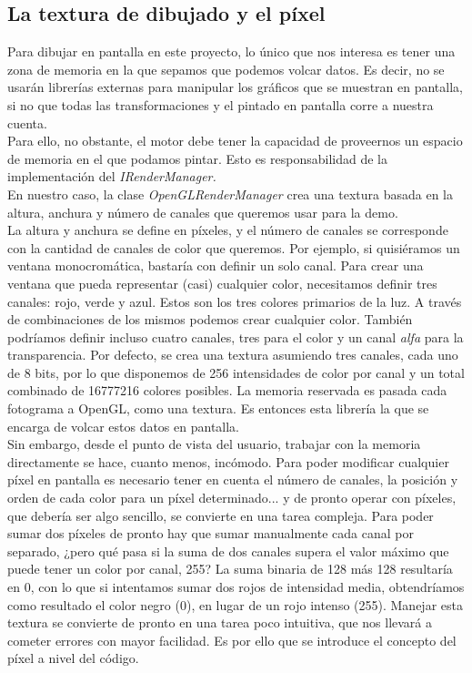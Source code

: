 \subsection{La textura de dibujado y el píxel}

Para dibujar en pantalla en este proyecto, lo único que nos interesa es tener una zona de memoria en la que sepamos que podemos volcar datos. Es decir, no se usarán librerías externas para manipular los gráficos que se muestran en pantalla, si no que todas las transformaciones y el pintado en pantalla corre a nuestra cuenta.\\

Para ello, no obstante, el motor debe tener la capacidad de proveernos un espacio de memoria en el que podamos pintar. Esto es responsabilidad de la implementación del \emph{IRenderManager.}\\

En nuestro caso, la clase \emph{OpenGLRenderManager} crea una textura basada en la altura, anchura y número de canales que queremos usar para la demo.\\

La altura y anchura se define en píxeles, y el número de canales se corresponde con la cantidad de canales de color que queremos. Por ejemplo, si quisiéramos un ventana monocromática, bastaría con definir un solo canal. Para crear una ventana que pueda representar (casi) cualquier color, necesitamos definir tres canales: rojo, verde y azul. Estos son los tres colores primarios de la luz. A través de combinaciones de los mismos podemos crear cualquier color. También podríamos definir incluso cuatro canales, tres para el color y un canal \emph{alfa} para la transparencia. Por defecto, se crea una textura asumiendo tres canales, cada uno de 8 bits, por lo que disponemos de 256 intensidades de color por canal y un total combinado de 16777216 colores posibles. La memoria reservada es pasada cada fotograma a OpenGL, como una textura. Es entonces esta librería la que se encarga de volcar estos datos en pantalla.\\

Sin embargo, desde el punto de vista del usuario, trabajar con la memoria directamente se hace, cuanto menos, incómodo. Para poder modificar cualquier píxel en pantalla es necesario tener en cuenta el número de canales, la posición y orden de cada color para un píxel determinado... y de pronto operar con píxeles, que debería ser algo sencillo, se convierte en una tarea compleja. Para poder sumar dos píxeles de pronto hay que sumar manualmente cada canal por separado, ¿pero qué pasa si la suma de dos canales supera el valor máximo que puede tener un color por canal, 255? La suma binaria de 128 más 128 resultaría en 0, con lo que si intentamos sumar dos rojos de intensidad media, obtendríamos como resultado el color negro (0), en lugar de un rojo intenso (255). Manejar esta textura se convierte de pronto en una tarea poco intuitiva, que nos llevará a cometer errores con mayor facilidad. Es por ello que se introduce el concepto del píxel a nivel del código.\\

